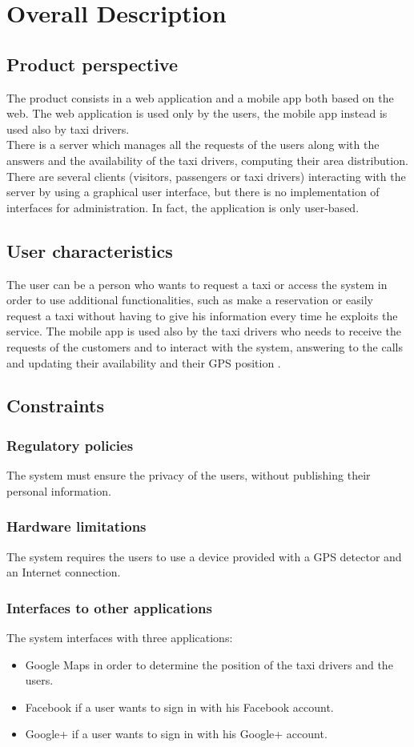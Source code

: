 \documentclass[18pt,oneside,a4paper, titlepage]{article}
\begin{document}
\newpage
\section{Overall Description}
	\subsection{Product perspective}
	The product consists in a web application and a mobile app both based on the web. The web application is used only by the users, the mobile app instead is used also by taxi drivers.\\
	There is a server which manages all the requests of the users along with the answers and the availability of the taxi drivers, computing their area distribution. There are several clients (visitors, passengers or taxi drivers) interacting with the server by using a graphical user interface, but there is no implementation of interfaces for administration. In fact, the application is only user-based.
	
	\subsection{User characteristics}
	The user can be a person who wants to request a taxi or access the system in order to use additional functionalities, such as make a reservation or easily request a taxi without having to give his information every time he exploits the service.
	The mobile app is used also by the taxi drivers who needs to receive the requests of the customers and to interact with the system, answering to the calls and updating their availability and their GPS position .
	
	\subsection{Constraints}
		\subsubsection{Regulatory policies}
		The system must ensure the privacy of the users, without publishing their personal information.
		\subsubsection{Hardware limitations}
		The system requires the users to use a device provided with a GPS detector and an Internet connection.
		\subsubsection{Interfaces to other applications}
		The system interfaces with three applications:
		\begin{itemize}
			\item Google Maps in order to determine the position of the taxi drivers and the users.
			\item Facebook if a user wants to sign in with his Facebook account.
			\item Google+ if a user wants to sign in with his Google+ account.
		\end{itemize}
\end{document}
